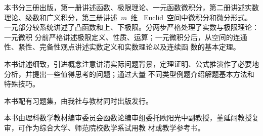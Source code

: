 

\begin{summary}
本书分三册出版，第一册讲述函数、极限理论、一元函数微积分，第二册讲述实数理论、级数和广义积分，第三册讲述~$m$~维
~Euclid~空间中微积分和微分形式。一元部分较系统讲述了凸函数和上、下极限。分两步严格处理了实数与极限理论：一元微积
分前严格讲述极限定义、性质、运算；一元微积分后，从空间的连通性、紧性、完备性观点讲述实数定义和实数理论以及连续函
数的基本定理。

本书讲述细致，引进概念注意讲清实际问题背景，定理证明、公式推演作了必要地分析，并提出一些值得思考的问题；通过大量
不同类型例题介绍解题基本方法和特殊技巧。

本书配有习题集，由我社与教材同时出版发行。

本书由理科数学教材编审委员会函数论编审组委托欧阳光中副教授，董延闿教授复审，可作为综合大学、师范院校数学系试用教
材或教学参考书。
\end{summary}

\MakeVolume*

\volfrontmatter



\VolumeTOC

\volmainmatter









\endinput
